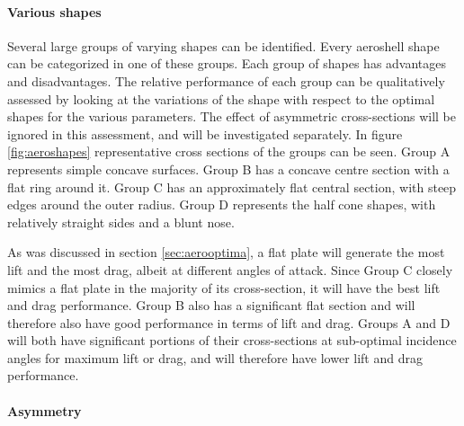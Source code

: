 \paragraph{Various shapes} \label{sec:aeroshapes}
Several large groups of varying shapes can be identified. Every aeroshell shape can be categorized in one of these groups.  Each group of shapes has advantages and disadvantages. The relative performance of each group can be qualitatively assessed by looking at the variations of the shape with respect to the optimal shapes for the various parameters. The effect of asymmetric cross-sections will be ignored in this assessment, and will be investigated separately. In figure \ref{fig:aeroshapes} representative cross sections of the groups can be seen. Group A represents simple concave surfaces. Group B has a concave centre section with a flat ring around it. Group C has an approximately flat central section, with steep edges around the outer radius. Group D represents the half cone shapes, with relatively straight sides and a blunt nose. 

As was discussed in section \ref{sec:aerooptima}, a flat plate will generate the most lift and the most drag, albeit at different angles of attack. Since Group C closely mimics a flat plate in the majority of its cross-section, it will have the best lift and drag performance. Group B also has a significant flat section and will therefore also have good performance in terms of lift and drag. Groups A and D will both have significant portions of their cross-sections at sub-optimal incidence angles for maximum lift or drag, and will therefore have lower lift and drag performance.



\paragraph{Asymmetry}























